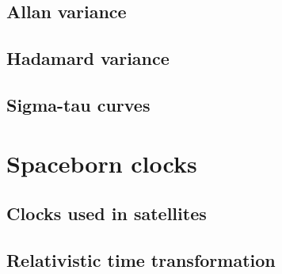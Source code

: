 \subsection{Allan variance}

\subsection{Hadamard variance}

\subsection{Sigma-tau curves}



\section{Spaceborn clocks}

\subsection{Clocks used in satellites}

\subsection{Relativistic time transformation}

